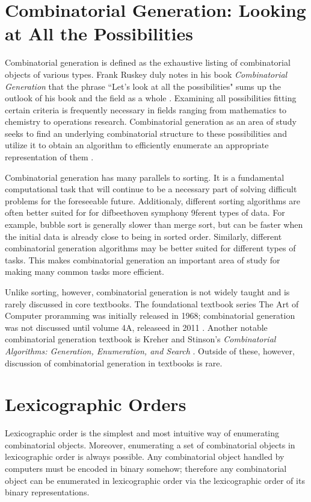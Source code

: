 
\section{Combinatorial Generation: Looking at All the Possibilities}

Combinatorial generation is defined as the exhaustive listing of combinatorial objects of various types.  Frank Ruskey duly notes in his book \emph{Combinatorial Generation} that the phrase ``Let's look at all the possibilities" sums up the outlook of his book and the field as a whole \cite{ruskey2003combinatorial}. Examining all possibilities fitting certain criteria is frequently necessary in fields ranging from mathematics to chemistry to operations research. Combinatorial generation as an area of study seeks to find an underlying combinatorial structure to these possibilities and utilize it to obtain an algorithm to efficiently enumerate an appropriate representation of them \cite{ruskey2003combinatorial}. 

Combinatorial generation has many parallels to sorting.  It is a fundamental computational task that will continue to be a necessary part of solving difficult problems for the foreseeable future.  Additionaly, different sorting algorithms are often better suited for for difbeethoven symphony 9ferent types of data.  For example, bubble sort is generally slower than merge sort, but can be faster when the initial data is already close to being in sorted order. Similarly, different combinatorial generation algorithms may be better suited for different types of tasks.  This makes combinatorial generation an important area of study for making many common tasks more efficient.  

Unlike sorting, however, combinatorial generation is not widely taught and is rarely discussed in core textbooks. The foundational textbook series The Art of Computer proramming was initially released in 1968; combinatorial generation was not discussed until volume 4A, releaseed in 2011 \cite{knuth2015art}.  Another notable combinatorial generation textbook is  Kreher and Stinson's \emph{Combinatorial Algorithms: Generation, Enumeration, and Search} \cite{kreher2020combinatorial}. Outside of these, however, discussion of combinatorial generation in textbooks is rare.

\section{Lexicographic Orders}
Lexicographic order is the simplest and most intuitive way of enumerating combinatorial objects.  Moreover, enumerating a set of combinatorial objects in lexicographic order is always possible. Any combinatorial object handled by computers must be encoded in binary somehow; therefore any combinatorial object can be enumerated in lexicographic order via the lexicographic order of its binary representations. 

